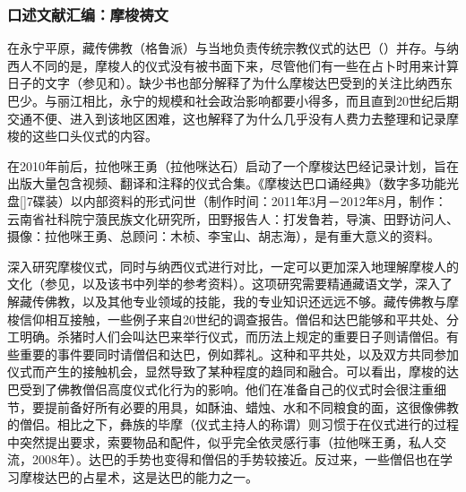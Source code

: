 \subsubsection{口述文献汇编：摩梭祷文}
\label{sec:collectionsoforalliteraturenaritualtexts}
在永宁平原，藏传佛教（格鲁派）与当地负责传统宗教仪式的达巴（）并存。与纳西人不同的是，摩梭人的仪式没有被书面下来，尽管他们有一些在占卜时用来计算日子的文字（参见\textcite{yang1985}和\textcite[163-189]{lidazhu2015}）。缺少书也部分解释了为什么摩梭达巴受到的关注比纳西东巴少。与丽江相比，永宁的规模和社会政治影响都要小得多，而且直到20世纪后期交通不便、进入到该地区困难，这也解释了为什么几乎没有人费力去整理和记录摩梭的这些口头仪式的内容。


在2010年前后，拉他咪王勇（拉他咪达石）启动了一个摩梭达巴经记录计划，旨在出版大量包含视频、翻译和注释的仪式合集。《摩梭达巴口诵经典》（数字多功能光盘[]7碟装）以内部资料的形式问世（制作时间：2011年3月－2012年8月，制作：云南省社科院宁蒗民族文化研究所，田野报告人：打发鲁若，导演、田野访问人、摄像：拉他咪王勇、总顾问：木桢、李宝山、胡志海），是有重大意义的资料。

深入研究摩梭仪式，同时与纳西仪式进行对比，一定可以更加深入地理解摩梭人的文化（参见\textcite{mathieu2015}，以及该书中列举的参考资料）。这项研究需要精通{藏语}文学，深入了解{藏}传佛教，以及其他专业领域的技能，我的专业知识还远远不够。{藏}传佛教与摩梭信仰相互接触，一些例子来自20世纪的调查报告。僧侣和{达巴}能够和平共处、分工明确。杀猪时人们会叫{达巴}来举行仪式，而历法上规定的重要日子则请僧侣。有些重要的事件要同时请僧侣和{达巴}，例如葬礼。这种和平共处，以及双方共同参加仪式而产生的接触机会，显然导致了某种程度的趋同和融合。可以看出，摩梭的{达巴}受到了佛教僧侣高度仪式化行为的影响。他们在准备自己的仪式时会很注重细节，要提前备好所有必要的用具，如酥油、蜡烛、水和不同粮食的面，这很像佛教的僧侣。相比之下，{彝}族的毕摩（仪式主持人的称谓）则习惯于在仪式进行的过程中突然提出要求，索要物品和配件，似乎完全依灵感行事（拉他咪王勇，私人交流，2008年）。{达巴}的手势也变得和僧侣的手势较接近。反过来，一些僧侣也在学习摩梭达巴的占星术，这是达巴的能力之一。


